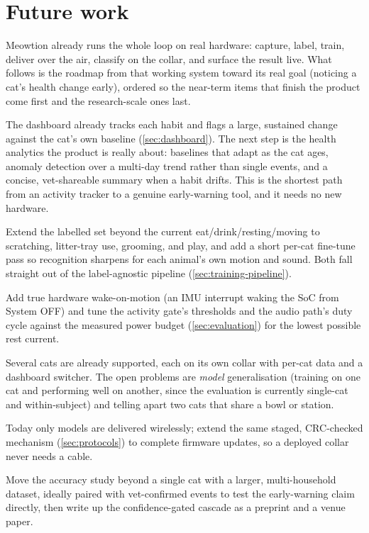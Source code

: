 \section{Future work}
\label{sec:future-work}

Meowtion already runs the whole loop on real hardware: capture, label, train, deliver over the air,
classify on the collar, and surface the result live. What follows is the roadmap from that working
system toward its real goal (noticing a cat's health change early), ordered so the near-term items
that finish the product come first and the research-scale ones last.

\begin{description}[leftmargin=1.6em,style=nextline]
  \item[From activity to health insight] The dashboard already tracks each habit and flags a large,
        sustained change against the cat's own baseline (\cref{sec:dashboard}). The next step is the
        health analytics the product is really about: baselines that adapt as the cat ages, anomaly
        detection over a multi-day trend rather than single events, and a concise, vet-shareable
        summary when a habit drifts. This is the shortest path from an activity tracker to a genuine
        early-warning tool, and it needs no new hardware.
  \item[Richer, per-cat recognition] Extend the labelled set beyond the current eat/drink/resting/moving to scratching,
        litter-tray use, grooming, and play, and add a short per-cat fine-tune pass so recognition
        sharpens for each animal's own motion and sound. Both fall straight out of the label-agnostic
        pipeline (\cref{sec:training-pipeline}).
  \item[Longer battery life] Add true hardware wake-on-motion (an IMU interrupt waking the SoC from
        System OFF) and tune the activity gate's thresholds and the audio path's duty cycle against
        the measured power budget (\cref{sec:evaluation}) for the lowest possible rest current.
  \item[Multiple cats and shared stations] Several cats are already supported, each on its own collar
        with per-cat data and a dashboard switcher. The open problems are \emph{model} generalisation
        (training on one cat and performing well on another, since the evaluation is currently
        single-cat and within-subject) and telling apart two cats that share a bowl or station.
  \item[Full firmware over the air] Today only models are delivered wirelessly; extend the same
        staged, CRC-checked mechanism (\cref{sec:protocols}) to complete firmware updates, so a
        deployed collar never needs a cable.
  \item[Field validation and publication] Move the accuracy study beyond a single cat with a larger,
        multi-household dataset, ideally paired with vet-confirmed events to test the early-warning
        claim directly, then write up the confidence-gated cascade as a preprint and a venue paper.
\end{description}
